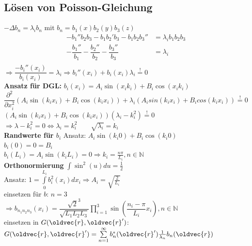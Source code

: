 \documentclass[6pt,a4paper]{scrartcl}
\let\vec\oldvec
\begin{document}
\begin{multicols}{4}
	\subsection{Lösen von Poisson-Gleichung}
	$-\Delta b_n = \lambda_ib_n$ mit $b_n=b_1(x)b_2(y)b_3(z)$
	\begin{align*}
		-b_1''b_2b_3-b_1b_2'b_3-b_1b_2b_3''&=\lambda_ib_1b_2b_3\\
		-\dfrac{b_1''}{b_1}-\dfrac{b_2''}{b_2}-\dfrac{b_3''}{b_3}&=\lambda_i\\
	\end{align*}
	$\Rightarrow \dfrac{-b_i''(x_i)}{b_i(x_i)}=\lambda_i \Rightarrow b_i''(x_i)+b_i(x_i)\lambda_i \stackrel{!}{=} 0$\\
	\textbf{Ansatz für DGL: } $b_i(x_i)=A_i\sin(x_ik_i)+B_i\cos(x_ik_i)$\\
	$\dfrac{\partial^2}{\partial x_i^2}(A_i\sin(k_ix_i)+B_i\cos(k_ix_i))+\lambda_i(A_isin(k_ix_i)+B_icos(k_ix_i)) \stackrel{!}{=} 0$\\
	$(A_i\sin(k_ix_i)+B_i\cos(k_ix_i))(\lambda_i-k_i^2)\stackrel{!}{=}0$\\
	$\Rightarrow \lambda-k_i^2=0 \Leftrightarrow \lambda_i=k_i^2 \qquad \sqrt{\lambda_i}=k_i$\\
	\textbf{Randwerte für $b_i$}
	Ansatz: $A_i\sin(k_i 0)+B_i\cos(k_i 0)$\\
	$b_i(0)=0=B_i$\\
	$b_i(L_i)=A_i\sin(k_iL_i)=0\Rightarrow k_i=\frac{n\pi}{L_i}, n\in \mathbb{N}$\\
	\textbf{Orthonormierung}
	$\int\sin^2(u)du=\frac{1}{2}$\\
	Ansatz: $1 = \int\limits_0^{L_i}b_i^2(x_i)dx_i\Rightarrow A_i=\sqrt{\frac{2}{L_i}}$\\
	einsetzen für $b$: $n=3$\\$\Rightarrow b_{n_1n_2n_3}(x_i)=\dfrac{\sqrt{2}^3}{\sqrt{L_1L_2L_3}}\prod\limits_{i=1}^3\sin\left(\dfrac{n_i-\pi}{L_i}x_i\right), n\in\mathbb{N}$\\
	einsetzen in $G(\vec{r},\vec{r}')$: $G(\vec{r},\vec{r}') = \sum\limits_{n=1}^{\infty}b_n^*(\vec{r}')\frac{1}{\lambda_n}b_n(\vec{r})$

\end{multicols}
\end{document}
